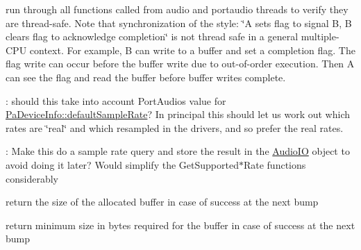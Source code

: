 
\begin{DoxyRefList}
\item[\label{todo__todo000043}%
\hypertarget{todo__todo000043}{}%
Class \hyperlink{class_audio_i_o}{Audio\+IO} ]run through all functions called from audio and portaudio threads to verify they are thread-\/safe. Note that synchronization of the style\+: \char`\"{}\+A sets flag to signal B, B clears flag to acknowledge completion\char`\"{} is not thread safe in a general multiple-\/\+C\+PU context. For example, B can write to a buffer and set a completion flag. The flag write can occur before the buffer write due to out-\/of-\/order execution. Then A can see the flag and read the buffer before buffer writes complete. 
\item[\label{todo__todo000044}%
\hypertarget{todo__todo000044}{}%
Member \hyperlink{class_audio_i_o_a71facd3c7274394b70eaff652e1bc97e}{Audio\+IO\+:\+:Get\+Optimal\+Supported\+Sample\+Rate} ()]\+: should this take into account Port\+Audio\textquotesingle{}s value for \hyperlink{struct_pa_device_info_a68f435353bfe1a4c9b632203a9afcacb}{Pa\+Device\+Info\+::default\+Sample\+Rate}? In principal this should let us work out which rates are \char`\"{}real\char`\"{} and which resampled in the drivers, and so prefer the real rates.  
\item[\label{todo__todo000045}%
\hypertarget{todo__todo000045}{}%
Member \hyperlink{class_audio_i_o_aef42a8e615a55e2b914a989e8b63af0b}{Audio\+IO\+:\+:Handle\+Device\+Change} ()]\+: Make this do a sample rate query and store the result in the \hyperlink{class_audio_i_o}{Audio\+IO} object to avoid doing it later? Would simplify the Get\+Supported$\ast$\+Rate functions considerably  
\item[\label{todo__todo000005}%
\hypertarget{todo__todo000005}{}%
Member \hyperlink{samplefmt_8h_a4db4c77f928d32c7d8854732f50b8c04}{av\+\_\+samples\+\_\+alloc} (uint8\+\_\+t $\ast$$\ast$audio\+\_\+data, int $\ast$linesize, int nb\+\_\+channels, int nb\+\_\+samples, enum A\+V\+Sample\+Format sample\+\_\+fmt, int align)]return the size of the allocated buffer in case of success at the next bump  
\item[\label{todo__todo000004}%
\hypertarget{todo__todo000004}{}%
Member \hyperlink{samplefmt_8h_a673254a62fa75dab3211caf17c73c6eb}{av\+\_\+samples\+\_\+fill\+\_\+arrays} (uint8\+\_\+t $\ast$$\ast$audio\+\_\+data, int $\ast$linesize, const uint8\+\_\+t $\ast$buf, int nb\+\_\+channels, int nb\+\_\+samples, enum A\+V\+Sample\+Format sample\+\_\+fmt, int align)]return minimum size in bytes required for the buffer in case of success at the next bump  

\end{DoxyRefList}
